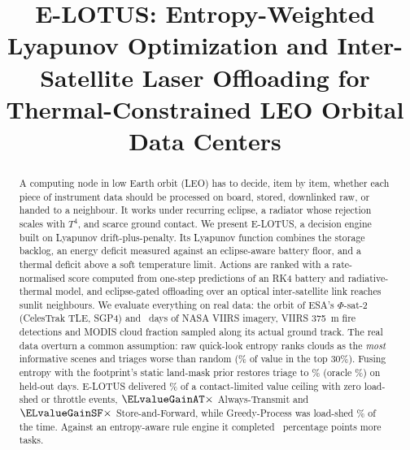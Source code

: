 \documentclass[conference]{IEEEtran}
\theoremstyle{remark}
\begin{document}
\title{E-LOTUS: Entropy-Weighted Lyapunov Optimization and Inter-Satellite Laser Offloading for Thermal-Constrained LEO Orbital Data Centers}

\author{
\and
{}
}

\maketitle

\begin{abstract}
A computing node in low Earth orbit (LEO) has to decide, item by item, whether each piece of instrument data should be processed on board, stored, downlinked raw, or handed to a neighbour. It works under recurring eclipse, a radiator whose rejection scales with $T^4$, and scarce ground contact. We present E-LOTUS, a decision engine built on Lyapunov drift-plus-penalty. Its Lyapunov function combines the storage backlog, an energy deficit measured against an eclipse-aware battery floor, and a thermal deficit above a soft temperature limit. Actions are ranked with a rate-normalised score computed from one-step predictions of an RK4 battery and radiative-thermal model, and eclipse-gated offloading over an optical inter-satellite link reaches sunlit neighbours. We evaluate everything on real data: the orbit of ESA's $\Phi$-sat-2 (CelesTrak TLE, SGP4) and \Days\ days of NASA VIIRS imagery, VIIRS 375~m fire detections and MODIS cloud fraction sampled along its actual ground track. The real data overturn a common assumption: raw quick-look entropy ranks clouds as the \emph{most} informative scenes and triages worse than random (\CapRaw\% of value in the top 30\%). Fusing entropy with the footprint's static land-mask prior restores triage to \CapEL\% (oracle \CapOracle\%) on held-out days. E-LOTUS delivered \ELceil\% of a contact-limited value ceiling with zero load-shed or throttle events, $\ELvalueGainAT\times$ Always-Transmit and $\ELvalueGainSF\times$ Store-and-Forward, while Greedy-Process was load-shed \GPshed\% of the time. Against an entropy-aware rule engine it completed \ELcomplDelta\ percentage points more tasks.
\end{abstract}
\end{document}
